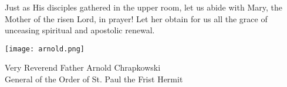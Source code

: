 {Just as His disciples gathered in the upper room, let us abide with Mary, the Mother of the risen Lord, in prayer! Let her obtain for us all the grace of unceasing spiritual and apostolic renewal.\par}


\begin{flushright}
\texttt{[image: arnold.png]}

Very Reverend Father Arnold Chrapkowski \\ General of the Order of St. Paul the Frist Hermit
\end{flushright}

\setlength{\parskip}{0em}

\newpage
